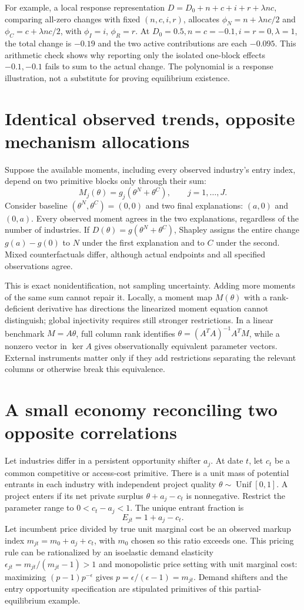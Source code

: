 \documentclass[11pt,a4paper]{article}
\begin{document}
For example, a local response representation $D=D_0+n+c+i+r+\lambda nc$, comparing all-zero changes with fixed $(n,c,i,r)$, allocates $\phi_N=n+\lambda nc/2$ and $\phi_C=c+\lambda nc/2$, with $\phi_I=i$, $\phi_R=r$. At $D_0=0.5,n=c=-0.1,i=r=0,\lambda=1$, the total change is $-0.19$ and the two active contributions are each $-0.095$. This arithmetic check shows why reporting only the isolated one-block effects $-0.1,-0.1$ fails to sum to the actual change. The polynomial is a response illustration, not a substitute for proving equilibrium existence.

\section{Identical observed trends, opposite mechanism allocations}
Suppose the available moments, including every observed industry's entry index, depend on two primitive blocks only through their sum:
\[
 M_j(\theta)=g_j(\theta^N+\theta^C),\qquad j=1,\ldots,J.
\]
Consider baseline $(\theta^N,\theta^C)=(0,0)$ and two final explanations: $(a,0)$ and $(0,a)$. Every observed moment agrees in the two explanations, regardless of the number of industries. If $D(\theta)=g(\theta^N+\theta^C)$, Shapley assigns the entire change $g(a)-g(0)$ to $N$ under the first explanation and to $C$ under the second. Mixed counterfactuals differ, although actual endpoints and all specified observations agree.

This is exact nonidentification, not sampling uncertainty. Adding more moments of the same sum cannot repair it. Locally, a moment map $M(\theta)$ with a rank-deficient derivative has directions the linearized moment equation cannot distinguish; global injectivity requires still stronger restrictions. In a linear benchmark $M=A\theta$, full column rank identifies $\theta=(A^TA)^{-1}A^TM$, while a nonzero vector in $\ker A$ gives observationally equivalent parameter vectors. External instruments matter only if they add restrictions separating the relevant columns or otherwise break this equivalence.

\section{A small economy reconciling two opposite correlations}
Let industries differ in a persistent opportunity shifter $a_j$. At date $t$, let $c_t$ be a common competitive or access-cost primitive. There is a unit mass of potential entrants in each industry with independent project quality $\theta\sim\operatorname{Unif}[0,1]$. A project enters if its net private surplus $\theta+a_j-c_t$ is nonnegative. Restrict the parameter range to $0<c_t-a_j<1$. The unique entrant fraction is
\[
 E_{jt}=1+a_j-c_t. \tag{3}
\]
Let incumbent price divided by true unit marginal cost be an observed markup index $m_{jt}=m_0+a_j+c_t$, with $m_0$ chosen so this ratio exceeds one. This pricing rule can be rationalized by an isoelastic demand elasticity $\epsilon_{jt}=m_{jt}/(m_{jt}-1)>1$ and monopolistic price setting with unit marginal cost: maximizing $(p-1)p^{-\epsilon}$ gives $p=\epsilon/(\epsilon-1)=m_{jt}$. Demand shifters and the entry opportunity specification are stipulated primitives of this partial-equilibrium example.
\end{document}
